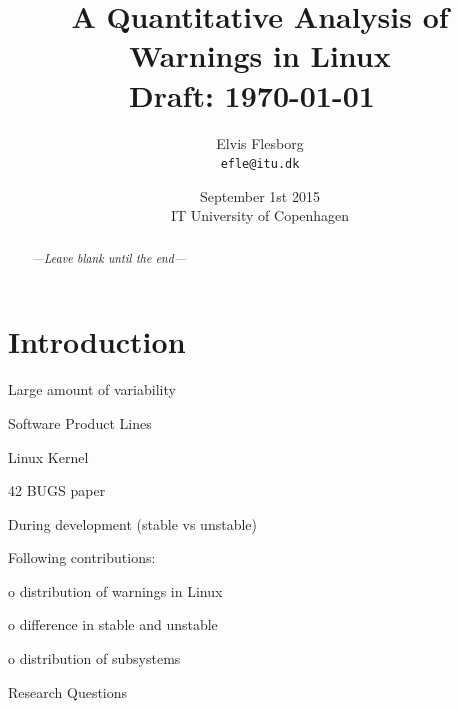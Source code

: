 \documentclass[a4paper,11pt]{report}
\begin{document}
\setlength{\parindent}{0cm}
\setlength{\unitlength}{1mm}

\date{September 1st 2015\\ IT University of Copenhagen}
\title{A Quantitative Analysis of Warnings in Linux \\ Draft: 
    \today~\currenttime}
\author{Elvis Flesborg\\
\texttt{efle@itu.dk}}
\clearpage\maketitle
\thispagestyle{empty}
\newpage

\tableofcontents
\thispagestyle{empty}



\newpage

\setcounter{page}{1}


\begin{abstract}
    \emph{---Leave blank until the end---}

\end{abstract}


\chapter{Introduction}
Large amount of variability

Software Product Lines

Linux Kernel

42 BUGS paper

During development (stable vs unstable)

Following contributions:

o distribution of warnings in Linux

o difference in stable and unstable

o distribution of subsystems

Research Questions




\newpage
\end{document}
